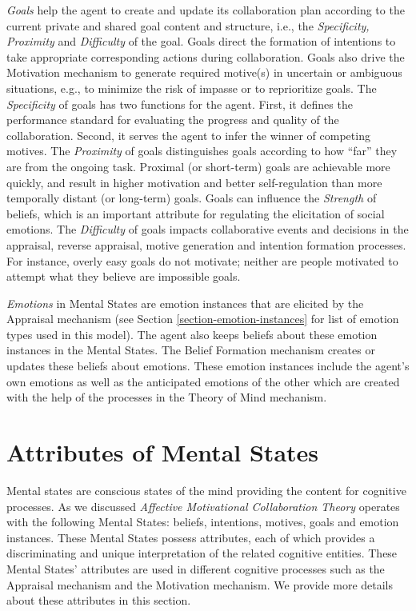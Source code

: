 \documentclass[12pt]{report}
\begin{document}
\textit{Goals} help the agent to create and update its collaboration plan
according to the current private and shared goal content and structure, i.e.,
the \textit{Specificity, Proximity} and \textit{Difficulty} of the goal. Goals
direct the formation of intentions to take appropriate corresponding actions
during collaboration. Goals also drive the Motivation mechanism to generate
required motive(s) in uncertain or ambiguous situations, e.g., to minimize the
risk of impasse or to reprioritize goals. The \textit{Specificity} of goals has
two functions for the agent. First, it defines the performance standard for
evaluating the progress and quality of the collaboration. Second, it serves the
agent to infer the winner of competing motives. The \textit{Proximity} of goals
distinguishes goals according to how ``far'' they are from the ongoing task.
Proximal (or short-term) goals are achievable more quickly, and result in higher
motivation and better self-regulation than more temporally distant (or
long-term) goals. Goals can influence the \textit{Strength} of beliefs, which is
an important attribute for regulating the elicitation of social emotions. The
\textit{Difficulty} of goals impacts collaborative events and decisions in the
appraisal, reverse appraisal, motive generation and intention formation
processes. For instance, overly easy goals do not motivate; neither are people
motivated to attempt what they believe are impossible goals.

\textit{Emotions} in Mental States are emotion instances that are elicited by
the Appraisal mechanism (see Section \ref{section-emotion-instances} for list of
emotion types used in this model). The agent also keeps beliefs about these
emotion instances in the Mental States. The Belief Formation mechanism creates
or updates these beliefs about emotions. These emotion instances include the
agent's own emotions as well as the anticipated emotions of the other which are
created with the help of the processes in the Theory of Mind mechanism.

\section{Attributes of Mental States}
\label{mental-states-properties}

Mental states are conscious states of the mind providing the content for
cognitive processes. As we discussed \textit{Affective Motivational
Collaboration Theory} operates with the following Mental States: beliefs,
intentions, motives, goals and emotion instances. These Mental States possess
attributes, each of which provides a discriminating and unique interpretation of
the related cognitive entities. These Mental States' attributes are used in
different cognitive processes such as the Appraisal mechanism and the Motivation
mechanism. We provide more details about these attributes in this section.
\end{document}
